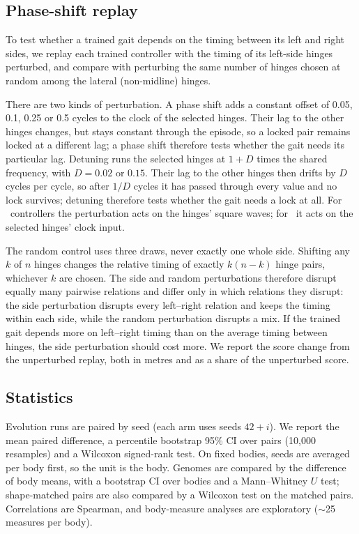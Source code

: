 \subsection{Phase-shift replay}
\label{sec:phase-shift}

To test whether a trained gait depends on the timing between its left and right sides, we replay each trained controller with the timing of its left-side hinges perturbed, and compare with perturbing the same number of hinges chosen at random among the lateral (non-midline) hinges.

There are two kinds of perturbation. A phase shift adds a constant offset of 0.05, 0.1, 0.25 or 0.5 cycles to the clock of the selected hinges. Their lag to the other hinges changes, but stays constant through the episode, so a locked pair remains locked at a different lag; a phase shift therefore tests whether the gait needs its particular lag. Detuning runs the selected hinges at $1 + D$ times the shared frequency, with $D = 0.02$ or $0.15$. Their lag to the other hinges then drifts by $D$ cycles per cycle, so after $1/D$ cycles it has passed through every value and no lock survives; detuning therefore tests whether the gait needs a lock at all. For \bb\ controllers the perturbation acts on the hinges' square waves; for \dann\ it acts on the selected hinges' clock input.

The random control uses three draws, never exactly one whole side. Shifting any $k$ of $n$ hinges changes the relative timing of exactly $k(n-k)$ hinge pairs, whichever $k$ are chosen. The side and random perturbations therefore disrupt equally many pairwise relations and differ only in which relations they disrupt: the side perturbation disrupts every left--right relation and keeps the timing within each side, while the random perturbation disrupts a mix. If the trained gait depends more on left--right timing than on the average timing between hinges, the side perturbation should cost more. We report the score change from the unperturbed replay, both in metres and as a share of the unperturbed score.

\subsection{Statistics}
\label{sec:stats}

Evolution runs are paired by seed (each arm uses seeds $42 + i$). We report the mean paired difference, a percentile bootstrap 95\% CI over pairs (10{,}000 resamples) and a Wilcoxon signed-rank test. On fixed bodies, seeds are averaged per body first, so the unit is the body. Genomes are compared by the difference of body means, with a bootstrap CI over bodies and a Mann--Whitney $U$ test; shape-matched pairs are also compared by a Wilcoxon test on the matched pairs. Correlations are Spearman, and body-measure analyses are exploratory ($\sim$25 measures per body).

